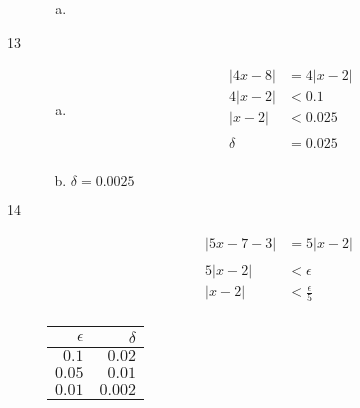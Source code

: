 \documentclass[letterpaper, landscape]{exam}
\begin{document}
\begin{description}
\begin{enumerate}[(a)]
          \item 
        \end{enumerate}

      \item[13]
        \begin{enumerate}[(a)]
          \item 
            \begin{align*}
              |4x - 8|    & = 4 |x - 2| \\
              4 | x - 2 | & < 0.1 \\
              |x - 2|     & < 0.025 \\
              \\
              \delta      & = \boxed{ 0.025 } \\
            \end{align*}

          \item $\delta = \boxed{ 0.0025 }$ 
        \end{enumerate}

      \item[14]
        \begin{align*}
          |5x - 7 - 3| & = 5 |x - 2| \\
          \\
          5 | x - 2 |  & < \epsilon \\
          |x - 2|      & < \frac{\epsilon}{5} \\
        \end{align*}

        \begin{tabular}[H]{rr}
          \toprule
          $\epsilon$ & $\delta$ \\
          \midrule
          $0.1$      & $0.02$ \\
          $0.05$     & $0.01$ \\
          $0.01$     & $0.002$ \\
          \bottomrule
        \end{tabular}


\end{description}
\end{document}
